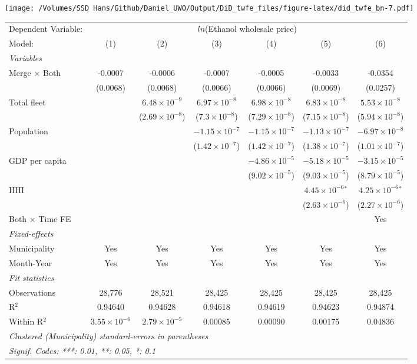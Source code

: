 \documentclass[
]{article}
\begin{document}
\texttt{[image: /Volumes/SSD Hans/Github/Daniel\_UWO/Output/DiD\_twfe\_files/figure-latex/did\_twfe\_bn-7.pdf]}

\begin{tabular}{lcccccc}
\tabularnewline\midrule\midrule
Dependent Variable:&\multicolumn{6}{c}{$ln$(Ethanol wholesale price)}\\
Model:&(1) & (2) & (3) & (4) & (5) & (6)\\
\midrule \emph{Variables}&   &   &   &   &   &  \\
Merge $\times $ Both & -0.0007 & -0.0006 & -0.0007 & -0.0005 & -0.0033 & -0.0354\\
  &(0.0068) & (0.0068) & (0.0066) & (0.0066) & (0.0069) & (0.0257)\\
Total fleet &    & $6.48\times 10^{-9}$ & $6.97\times 10^{-8}$ & $6.98\times 10^{-8}$ & $6.83\times 10^{-8}$ & $5.53\times 10^{-8}$\\
  &   & ($2.69\times 10^{-8}$) & ($7.3\times 10^{-8}$) & ($7.29\times 10^{-8}$) & ($7.15\times 10^{-8}$) & ($5.94\times 10^{-8}$)\\
Population &    &    & $-1.15\times 10^{-7}$ & $-1.15\times 10^{-7}$ & $-1.13\times 10^{-7}$ & $-6.97\times 10^{-8}$\\
  &   &    & ($1.42\times 10^{-7}$) & ($1.42\times 10^{-7}$) & ($1.38\times 10^{-7}$) & ($1.01\times 10^{-7}$)\\
GDP per capita &    &    &    & $-4.86\times 10^{-5}$ & $-5.18\times 10^{-5}$ & $-3.15\times 10^{-5}$\\
  &   &    &    & ($9.02\times 10^{-5}$) & ($9.03\times 10^{-5}$) & ($8.79\times 10^{-5}$)\\
HHI &    &    &    &    & $4.45\times 10^{-6}$$^{*}$ & $4.25\times 10^{-6}$$^{*}$\\
  &   &    &    &    & ($2.63\times 10^{-6}$) & ($2.27\times 10^{-6}$)\\
Both $\times$ Time FE &  &  &  &  &  & Yes\\
\midrule \emph{Fixed-effects}&   &   &   &   &   &  \\
Municipality & Yes & Yes & Yes & Yes & Yes & Yes\\
Month-Year & Yes & Yes & Yes & Yes & Yes & Yes\\
\midrule \emph{Fit statistics}&  & & & & & \\
Observations & 28,776&28,521&28,425&28,425&28,425&28,425\\
R$^2$ & 0.94640&0.94628&0.94618&0.94619&0.94623&0.94874\\
Within R$^2$ & $3.55\times 10^{-6}$&$2.79\times 10^{-5}$&0.00085&0.00090&0.00175&0.04836\\
\midrule\midrule\multicolumn{7}{l}{\emph{Clustered (Municipality) standard-errors in parentheses}}\\
\multicolumn{7}{l}{\emph{Signif. Codes: ***: 0.01, **: 0.05, *: 0.1}}\\
\end{tabular}
\end{document}
